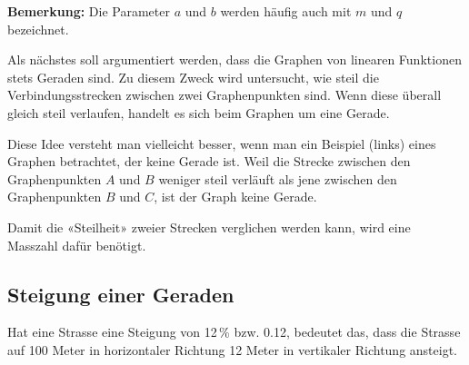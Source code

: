 \textbf{Bemerkung:} Die Parameter $a$ und $b$ werden häufig auch mit $m$ und $q$ bezeichnet.
\bigskip

\begin{minipage}{0.4\textwidth}
\end{minipage}\hfill
\begin{minipage}{0.56\textwidth}
    Als nächstes soll argumentiert werden, dass die Graphen von linearen Funktionen stets Geraden sind. Zu diesem Zweck wird untersucht, wie steil die Verbindungsstrecken zwischen zwei Graphenpunkten sind. Wenn diese überall gleich steil verlaufen, handelt es sich beim Graphen um eine Gerade.

    \medskip
    Diese Idee versteht man vielleicht besser, wenn man ein Beispiel (links) eines Graphen betrachtet, der keine Gerade ist. Weil die Strecke zwischen den Graphenpunkten $A$ und $B$ weniger steil verläuft als jene zwischen den Graphenpunkten $B$ und $C$, ist der Graph keine Gerade.
\end{minipage}
\medskip

Damit die «Steilheit» zweier Strecken verglichen werden kann, wird eine Masszahl dafür benötigt.

\subsection{Steigung einer Geraden}
\begin{minipage}{0.85\textwidth}
    Hat eine Strasse eine Steigung von 12\,\% bzw. 0.12, bedeutet das, dass die Strasse auf 100 Meter in horizontaler Richtung 12 Meter in vertikaler Richtung ansteigt.
\end{minipage}\hfill
\begin{minipage}{0.12\textwidth}
    \centering
\end{minipage}
\medskip

